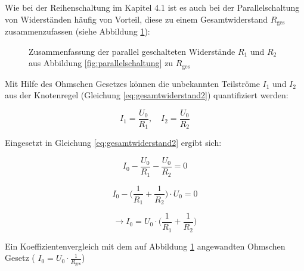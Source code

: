 \begin{frame}
{		Wie bei der Reihenschaltung im Kapitel 4.1 ist es auch bei der Parallelschaltung von Widerständen
		häufig von Vorteil, diese zu einem Gesamtwiderstand $R_\mathrm{ges}$ zusammenzufassen (siehe Abbildung \ref{fig:parallelzusammen}):

		\begin{figure}[ht]
			\begin{center}


			\end{center}
			\caption{Zusammenfassung der parallel geschalteten Widerstände $R_1$ und $R_2$ aus Abbildung \ref{fig:parallelschaltung} zu $R_\mathrm{ges}$}
			\label{fig:parallelzusammen}
		\end{figure}

		Mit Hilfe des Ohmschen Gesetzes können die unbekannten Teilströme $I_1$ und $I_2$ aus der Knotenregel (Gleichung \ref{eq:gesamtwiderstand2}) quantifiziert werden:

		\begin{equation*}
			I_1 = \frac{U_0}{R_1}, \quad I_2 = \frac{U_0}{R_2}
		\end{equation*}

		Eingesetzt in Gleichung \ref{eq:gesamtwiderstand2} ergibt sich:



		\begin{equation*}
			I_0 - \frac{U_0}{R_1} - \frac{U_0}{R_2} = 0
		\end{equation*}


		\begin{equation*}
			I_0 - \bigg( \frac{1}{R_1}+\frac{1}{R_2} \bigg) \cdot U_0 = 0
		\end{equation*}

		\begin{equation*}
			\rightarrow I_0 = U_0 \cdot  \bigg( \frac{1}{R_1}+\frac{1}{R_2} \bigg)
		\end{equation*}


		Ein Koeffizientenvergleich mit dem auf Abbildung \ref{fig:parallelzusammen} angewandten Ohmschen Gesetz
		( $I_0 = U_0 \cdot \frac{1}{R_\mathrm{ges}}$)

}
\end{frame}
